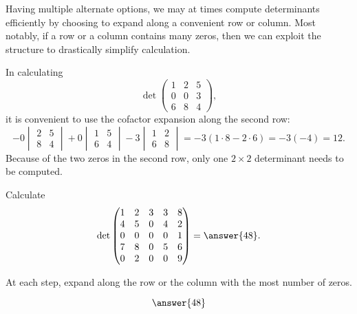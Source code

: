 \documentclass{ximera}
\begin{document}
Having multiple alternate options, we may at times compute
determinants efficiently by choosing to expand along a convenient row
or column. Most notably, if a row or a column contains many zeros,
then we can exploit the structure to drastically simplify calculation.

\begin{example}
  In calculating
  \[
    \det
    \begin{pmatrix}
      1 & 2 & 5 \\
      0 & 0 & 3 \\
      6 & 8 & 4
    \end{pmatrix},
  \]
  it is convenient to use the cofactor expansion along the second row:
  \[
    - 0
    \begin{vmatrix}
      2 & 5 \\ 8 & 4
    \end{vmatrix}
    + 0
    \begin{vmatrix}
      1 & 5 \\ 6 & 4
    \end{vmatrix}
    - 3
    \begin{vmatrix}
      1 & 2 \\ 6 & 8
    \end{vmatrix}
    = -3 (1 \cdot 8 - 2 \cdot 6) = -3 (-4) = 12.
  \]
  Because of the two zeros in the second row, only one $2 \times 2$
  determinant needs to be computed.
\end{example}

\begin{question}
  Calculate
  \[
    \det
    \begin{pmatrix}
      1 & 2 & 3 & 3 & 8 \\
      4 & 5 & 0 & 4 & 2\\
      0 & 0 & 0 & 0 & 1 \\
      7 & 8 & 0 & 5 & 6 \\
      0 & 2 & 0 & 0 & 9
    \end{pmatrix} = \answer{48}.
  \]
  \begin{hint} At each step, expand along the row or the column with
    the most number of zeros.
  \end{hint}
  \begin{prompt}
    \[
    \answer{48}
    \]
  \end{prompt}
\end{question}
\end{document}
